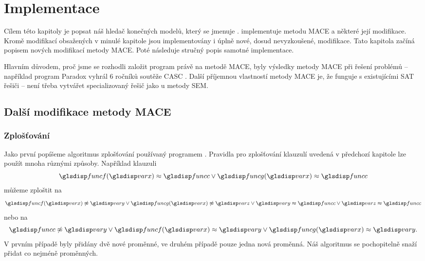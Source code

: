 \chapter{Implementace}

Cílem této kapitoly je popsat náš hledač konečných modelů, který
se jmenuje \crossbow. \crossbow{} implementuje metodu MACE
a některé její modifikace.
Kromě modifikací obsažených v minulé kapitole jsou implementovány
i úplně nové, dosud nevyzkoušené, modifikace.
Tato kapitola začíná popisem nových modifikací metody MACE.
Poté následuje stručný popis samotné implementace.

Hlavním důvodem, proč jsme se rozhodli založit program
\crossbow{} právě na metodě MACE,
byly výsledky metody MACE při řešení problémů --
například program Paradox \cite{paradox} vyhrál
6 ročníků soutěže CASC \cite{sutcliffe2006casc}. Další příjemnou vlastností
metody MACE je, že funguje s existujícími SAT řešiči --
není třeba vytvářet specializovaný řešič jako u metody SEM.

\section{Další modifikace metody MACE}

\subsection{Zplošťování}

Jako první popíšeme algoritmus zplošťování používaný
programem \crossbow. Pravidla pro zplošťování klauzulí
uvedená v předchozí kapitole lze použít mnoha různými způsoby.
Například klauzuli
\begin{equation} \label{eq:flatten-input}
  \func(\var) \approx \funcC \vee \funcG(\var) \approx \funcC
\end{equation}
můžeme zploštit na
\begin{equation} \label{eq:flatten-bad-output}
  \func(\var) \not\approx \varY \vee \funcG(\var) \not\approx \varZ \vee
    \varY \approx \funcC \vee \varZ \approx \funcC
\end{equation}
nebo na
\begin{equation} \label{eq:flatten-good-output}
  \funcC \not\approx \varY \vee
    \func(\var) \approx \varY \vee \funcG(\var) \approx \varY.
\end{equation}
V prvním případě byly přidány dvě nové proměnné, ve druhém případě
pouze jedna nová proměnná. Náš algoritmus se pochopitelně snaží
přidat co nejméně proměnných.

